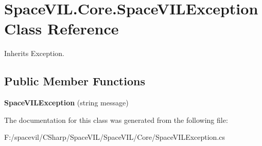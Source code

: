 \hypertarget{class_space_v_i_l_1_1_core_1_1_space_v_i_l_exception}{}\section{Space\+V\+I\+L.\+Core.\+Space\+V\+I\+L\+Exception Class Reference}
\label{class_space_v_i_l_1_1_core_1_1_space_v_i_l_exception}


Inherits Exception.

\subsection*{Public Member Functions}
\begin{DoxyCompactItemize}
\item 
\mbox{\label{class_space_v_i_l_1_1_core_1_1_space_v_i_l_exception_a72d073e6629374861f5afe9d3c446ad0}} 
{\bfseries Space\+V\+I\+L\+Exception} (string message)
\end{DoxyCompactItemize}


The documentation for this class was generated from the following file\+:\begin{DoxyCompactItemize}
\item 
F\+:/spacevil/\+C\+Sharp/\+Space\+V\+I\+L/\+Space\+V\+I\+L/\+Core/Space\+V\+I\+L\+Exception.\+cs\end{DoxyCompactItemize}
